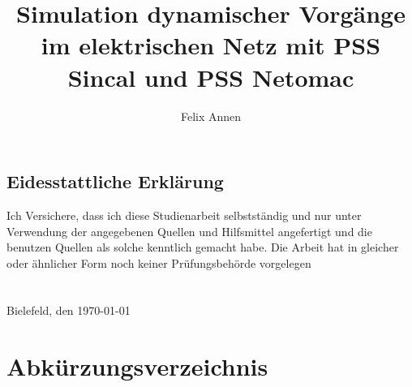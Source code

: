 \documentclass{scrartcl}
\title{Simulation dynamischer Vorgänge im elektrischen Netz mit PSS Sincal und PSS Netomac}
\author{Felix Annen}
\begin{document}
\begin{titlepage}



\maketitle
\thispagestyle{empty}
\newpage
	\subsection*{Eidesstattliche Erklärung}
	\glqq Ich Versichere, dass ich diese Studienarbeit selbstständig und nur unter Verwendung der angegebenen Quellen und Hilfsmittel angefertigt und die benutzen Quellen als solche kenntlich gemacht habe. Die Arbeit hat in gleicher oder ähnlicher Form noch keiner Prüfungsbehörde vorgelegen\grqq \\ \\ \\
	Bielefeld, den \today


\end{titlepage}


	\setcounter{page}{1}
	\tableofcontents
	\newpage
	\listoffigures
	\listoftables
	\section*{Abkürzungsverzeichnis}
	
\end{document}
